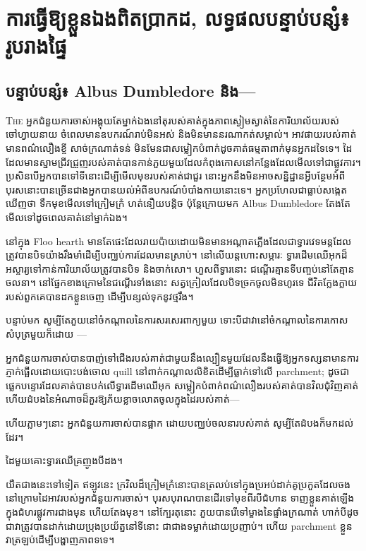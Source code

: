 \chapter{ការធ្វើឱ្យខ្លួនឯងពិតប្រាកដ, លទ្ធផលបន្ទាប់បន្សំ៖ រូបរាងផ្ទៃ}

\section{បន្ទាប់បន្សំ៖ Albus Dumbledore និង—}

\lettrine{T}{he} អ្នកជំនួយការចាស់អង្គុយតែម្នាក់ឯងនៅតុរបស់គាត់ក្នុងភាពស្ងៀមស្ងាត់នៃការិយាល័យរបស់ចៅហ្វាយនាយ ចំពេលមានឧបករណ៍រាប់មិនអស់ និងមិនមាននរណាកត់សម្គាល់។ អាវផាយ​របស់​គាត់​មាន​ពណ៌​លឿង​ខ្ចី សាច់​ក្រណាត់​ទន់ មិន​មែន​ជា​សម្លៀក​បំពាក់​ដូច​គាត់​ធម្មតា​ពាក់​មុន​អ្នក​ដទៃ​ទេ។ ដៃ​ដែល​មាន​ស្នាម​ជ្រីវជ្រួញ​របស់​គាត់​បាន​កាន់​ភួយ​មួយ​ដែល​កំពុង​កោស​នៅ​កន្លែង​ដែល​មើល​ទៅ​ជា​ផ្លូវការ។ ប្រសិនបើអ្នកបានទៅទីនោះដើម្បីមើលមុខរបស់គាត់ជាជួរ នោះអ្នកនឹងមិនអាចសន្និដ្ឋានអ្វីបន្ថែមអំពីបុរសនោះបានច្រើនជាងអ្នកបានយល់អំពីឧបករណ៍បំបាំងកាយនោះទេ។ អ្នកប្រហែលជាធ្លាប់សង្កេតឃើញថា ទឹកមុខមើលទៅក្រៀមក្រំ ហត់នឿយបន្តិច ប៉ុន្តែក្រោយមក Albus Dumbledore តែងតែមើលទៅដូចពេលគាត់នៅម្នាក់ឯង។

នៅក្នុង Floo hearth មានតែផេះដែលរាយប៉ាយដោយមិនមានអណ្តាតភ្លើងដែលជាទ្វារវេទមន្តដែលត្រូវបានបិទយ៉ាងរឹងមាំដើម្បីបញ្ឈប់ការដែលមានស្រាប់។ នៅលើយន្តហោះសម្ភារៈ ទ្វារដើមឈើអុកដ៏អស្ចារ្យទៅកាន់ការិយាល័យត្រូវបានបិទ និងចាក់សោ។ ហួសពីទ្វារនោះ ជណ្ដើរគ្មានទីបញ្ចប់នៅតែគ្មានចលនា។ នៅផ្នែកខាងក្រោមនៃជណ្តើរទាំងនោះ សត្វក្រៀលដែលបិទច្រកចូលមិនហូរទេ ជីវិតក្លែងក្លាយរបស់ពួកគេបានដកខ្លួនចេញ ដើម្បីបន្សល់ទុកនូវថ្មរឹង។

បន្ទាប់​មក សូម្បី​តែ​ភួយ​នៅ​ចំ​កណ្តាល​នៃ​ការ​សរសេរ​ពាក្យ​មួយ ទោះ​បី​ជា​វា​នៅ​ចំ​កណ្តាល​នៃ​ការ​កោស​សំបុត្រ​មួយ​ក៏​ដោយ —

អ្នកជំនួយការចាស់បានបាញ់ទៅជើងរបស់គាត់ជាមួយនឹងល្បឿនមួយដែលនឹងធ្វើឱ្យអ្នកទស្សនាមានការភ្ញាក់ផ្អើលដោយបោះបង់ចោល quill នៅពាក់កណ្តាលលិខិតដើម្បីធ្លាក់ទៅលើ parchment; ដូចជាផ្លេកបន្ទោរដែលគាត់បានបក់លើទ្វារដើមឈើអុក សម្លៀកបំពាក់ពណ៌លឿងរបស់គាត់បានវិលជុំវិញគាត់ ហើយដំបងនៃអំណាចដ៏គួរឱ្យភ័យខ្លាចលោតចូលក្នុងដៃរបស់គាត់—

ហើយភ្លាមៗនោះ អ្នកជំនួយការចាស់បានផ្អាក ដោយបញ្ឈប់ចលនារបស់គាត់ សូម្បីតែដំបងក៏មកដល់ដែរ។

ដៃ​មួយ​គោះ​ទ្វារ​ឈើ​គ្រញូង​បី​ដង។

យឺតជាងនេះទៅទៀត ឥឡូវនេះ ក្រវិលដ៏ក្រៀមក្រំនោះបានត្រលប់ទៅក្នុងប្រអប់ដាក់គូប្រកួតដែលចងនៅក្រោមដៃអាវរបស់អ្នកជំនួយការចាស់។ បុរស​បុរាណ​បាន​ដើរ​ទៅមុខ​ពីរបី​ជំហាន ទាញ​ខ្លួន​គាត់​ឡើង​ក្នុង​ជំហរ​ផ្លូវការ​ជាង​មុន ហើយ​តែង​មុខ។ នៅក្បែរតុនោះ ភួយបានរើទៅម្ខាងនៃផ្ទាំងក្រណាត់ ហាក់បីដូចជាវាត្រូវបានដាក់ដោយប្រុងប្រយ័ត្ននៅទីនោះ ជាជាងទម្លាក់ដោយប្រញាប់។ ហើយ parchment ខ្លួនវាត្រឡប់ដើម្បីបង្ហាញភាពទទេ។

